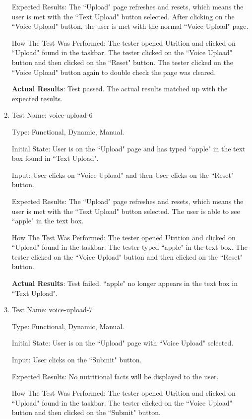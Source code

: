 \documentclass[12pt, titlepage]{article}
\begin{document}
\begin{enumerate}
		Expected Results: The ``Upload" page refreshes and resets, which means the user is met with the ``Text Upload" button selected. After clicking on the ``Voice Upload" button, the user is met with the normal ``Voice Upload" page.
		
		How The Test Was Performed: The tester opened Utrition and clicked on ``Upload" found in the taskbar. The tester clicked on the ``Voice Upload" button and then clicked on the ``Reset" button. The tester clicked on the ``Voice Upload" button again to double check the page was cleared. 
		
		\textbf{Actual Results}: Test passed. The actual results matched up with the expected results.
		
		\item{Test Name: voice-upload-6}
		
		Type: Functional, Dynamic, Manual.
		
		Initial State: User is on the ``Upload" page and has typed ``apple" in the text box found in ``Text Upload".
		
		Input: User clicks on ``Voice Upload" and then User clicks on the ``Reset" button.
		
		Expected Results: The ``Upload" page refreshes and resets, which means the user is met with the ``Text Upload" button selected. The user is able to see ``apple" in the text box.
		
		How The Test Was Performed: The tester opened Utrition and clicked on ``Upload" found in the taskbar. The tester typed ``apple" in the text box. The tester clicked on the ``Voice Upload" button and then clicked on the ``Reset" button.
		
		\textbf{Actual Results}: Test failed. ``apple" no longer appears in the text box in ``Text Upload".
		
		\item{Test Name: voice-upload-7}
		
		Type: Functional, Dynamic, Manual.
		
		Initial State: User is on the ``Upload" page with ``Voice Upload" selected.
		
		Input: User clicks on the ``Submit" button.
		
		Expected Results: No nutritional facts will be displayed to the user.
		
		How The Test Was Performed: The tester opened Utrition and clicked on ``Upload" found in the taskbar. The tester clicked on the ``Voice Upload" button and then clicked on the ``Submit" button.
		

\end{enumerate}
\end{document}
